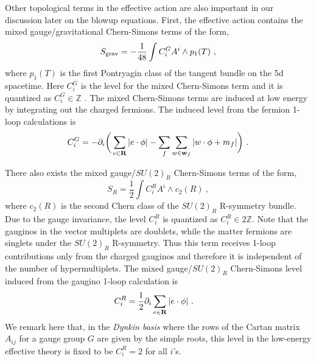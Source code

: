 Other topological terms in the effective action are also important in our discussion later on the blowup equations. First, the effective action contains the mixed gauge/gravitational Chern-Simons terms of the form, \cite{Bonetti:2011mw,Bonetti:2013ela,Grimm:2015zea}
\begin{equation}\label{eq:grav-CS}
	S_{\rm grav} = -\frac{1}{48}\int C^G_i A^i\wedge p_1(T) \ ,
\end{equation}
where $p_1(T)$ is the first Pontryagin class of the tangent bundle on the 5d spacetime. Here $C_i^G$ is the level for the mixed Chern-Simons term and it is quantized as $C_i^G\in \mathbb{Z}$ \cite{Chang:2019uag,Katz:2020ewz}. The mixed Chern-Simons terms are induced at low energy by integrating out the charged fermions. The induced level from the fermion 1-loop calculations is \cite{Bonetti:2013ela,Grimm:2015zea}
\begin{equation}
	C_i^G = -\partial_i\bigg(\sum_{e\in {\bf R}}|e\cdot \phi| - \sum_f\sum_{w\in{\bf w}_f}|w\cdot\phi+m_f|\bigg) \ .
\end{equation}

There also exists the mixed gauge/$SU(2)_R$ Chern-Simons terms of the form,
\begin{equation}\label{eq:R-CS}
	S_{R} = \frac{1}{2}\int C_i^R A^i\wedge c_2(R)\ ,
\end{equation}
where $c_2(R)$ is the second Chern class of the $SU(2)_R$ R-symmetry bundle. Due to the gauge invariance, the level $C^R_i$ is quantized as $C^R_i\in 2\mathbb{Z}$. Note that the gauginos in the vector multiplets are doublets, while the matter fermions are singlets under the $SU(2)_R$ R-symmetry. Thus this term receives 1-loop contributions only from the charged gauginos and therefore it is independent of the number of hypermultiplets. The mixed gauge/$SU(2)_R$ Chern-Simons level induced from the gaugino 1-loop calculation is \cite{BenettiGenolini:2019zth}
\begin{align}\label{eq:CS-R}
	C^R_i &= \frac{1}{2} \partial_i \sum_{e\in {\bf R}}|e\cdot \phi| \ .
\end{align}
We remark here that, in the {\it Dynkin basis} where the rows of the Cartan matrix $A_{ij}$ for a gauge group $G$ are given by the simple roots, this level in the low-energy effective theory is fixed to be $C^R_i=2$ for all $i$'s.


